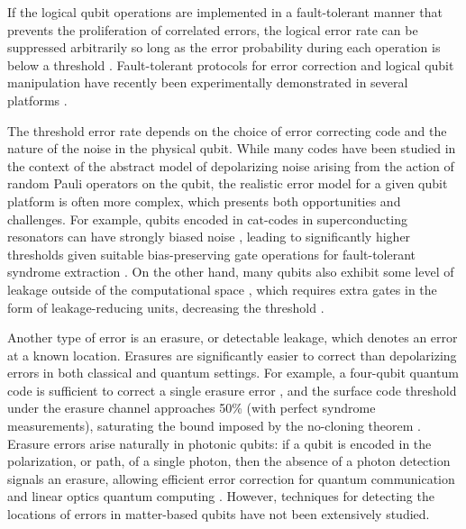 \documentclass[%
reprint,
superscriptaddress,
 amsmath,amssymb,
 aps,
 prx,
floatfix,
]{revtex4-1}
\begin{document}
If the logical qubit operations are implemented in a fault-tolerant manner that prevents the proliferation of correlated errors, the logical error rate can be suppressed arbitrarily so long as the error probability during each operation is below a threshold \cite{aharonov2008,knill1996}. Fault-tolerant protocols for error correction and logical qubit manipulation have recently been experimentally demonstrated in several platforms \cite{egan2021,ryan-anderson2021,abobeih2021,postler2021}.

The threshold error rate depends on the choice of error correcting code and the nature of the noise in the physical qubit. While many codes have been studied in the context of the abstract model of depolarizing noise arising from the action of random Pauli operators on the qubit, the realistic error model for a given qubit platform is often more complex, which presents both opportunities and challenges. For example, qubits encoded in cat-codes in superconducting resonators can have strongly biased noise \cite{grimm2020}, leading to significantly higher thresholds \cite{aliferis2008,darmawan2021} given suitable bias-preserving gate operations for fault-tolerant syndrome extraction \cite{puri2020}. On the other hand, many qubits also exhibit some level of leakage outside of the computational space \cite{knill1996,preskill1997}, which requires extra gates in the form of leakage-reducing units, decreasing the threshold \cite{suchara2015}.

Another type of error is an erasure, or detectable leakage, which denotes an error at a known location. Erasures are significantly easier to correct than depolarizing errors in both classical \cite{coverthomasm2006} and quantum \cite{grassl1997, gottesman1997} settings. For example, a four-qubit quantum code is sufficient to correct a single erasure error \cite{grassl1997}, and the surface code threshold under the erasure channel approaches 50\% (with perfect syndrome measurements), saturating the bound imposed by the no-cloning theorem \cite{stace2009}. Erasure errors arise naturally in photonic qubits: if a qubit is encoded in the polarization, or path, of a single photon, then the absence of a photon detection signals an erasure, allowing efficient error correction for quantum communication \cite{muralidharan2014} and linear optics quantum computing \cite{knill2001,kok2007}. However, techniques for detecting the locations of errors in matter-based qubits have not been extensively studied.
\end{document}
